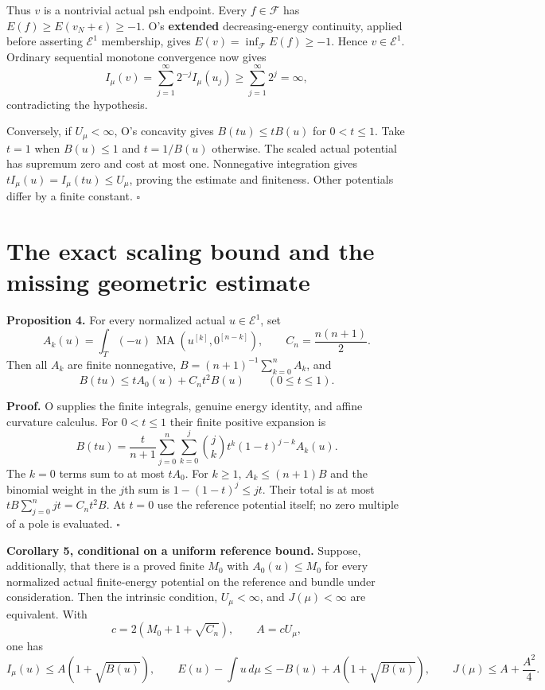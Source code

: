 \documentclass[
  11pt,
]{article}
\begin{document}
Thus \(v\) is a nontrivial actual psh endpoint. Every \(f\in\mathcal F\)
has \(E(f)\geq E(v_N+\epsilon)\geq-1\). O's \textbf{extended}
decreasing-energy continuity, applied before asserting \(\mathcal E^1\)
membership, gives \(E(v)=\inf_{\mathcal F}E(f)\geq-1\). Hence
\(v\in\mathcal E^1\). Ordinary sequential monotone convergence now gives
\[
 I_\mu(v)=\sum_{j=1}^\infty2^{-j}I_\mu(u_j)
          \geq\sum_{j=1}^\infty2^j=\infty,
\] contradicting the hypothesis.

Conversely, if \(U_\mu<\infty\), O's concavity gives \(B(tu)\leq tB(u)\)
for \(0<t\leq1\). Take \(t=1\) when \(B(u)\leq1\) and \(t=1/B(u)\)
otherwise. The scaled actual potential has supremum zero and cost at
most one. Nonnegative integration gives
\(tI_\mu(u)=I_\mu(tu)\leq U_\mu\), proving the estimate and finiteness.
Other potentials differ by a finite constant. \(\square\)

\section{The exact scaling bound and the missing geometric
estimate}\label{the-exact-scaling-bound-and-the-missing-geometric-estimate}

\textbf{Proposition 4.} For every normalized actual
\(u\in\mathcal E^1\), set \[
 A_k(u)=\int_T(-u)\,\operatorname{MA}(u^{[k]},0^{[n-k]}),\qquad
 C_n=\frac{n(n+1)}2.
\] Then all \(A_k\) are finite nonnegative,
\(B=(n+1)^{-1}\sum_{k=0}^nA_k\), and \[
 B(tu)\leq tA_0(u)+C_nt^2B(u)\qquad(0\leq t\leq1).
\]

\textbf{Proof.} O supplies the finite integrals, genuine energy
identity, and affine curvature calculus. For \(0<t\leq1\) their finite
positive expansion is \[
 B(tu)=\frac t{n+1}\sum_{j=0}^n\sum_{k=0}^j
       \binom jk t^k(1-t)^{j-k}A_k(u).
\] The \(k=0\) terms sum to at most \(tA_0\). For \(k\geq1\),
\(A_k\leq(n+1)B\) and the binomial weight in the \(j\)th sum is
\(1-(1-t)^j\leq jt\). Their total is at most
\(tB\sum_{j=0}^n jt=C_nt^2B\). At \(t=0\) use the reference potential
itself; no zero multiple of a pole is evaluated. \(\square\)

\textbf{Corollary 5, conditional on a uniform reference bound.} Suppose,
additionally, that there is a proved finite \(M_0\) with
\(A_0(u)\leq M_0\) for every normalized actual finite-energy potential
on the reference and bundle under consideration. Then the intrinsic
condition, \(U_\mu<\infty\), and \(J(\mu)<\infty\) are equivalent. With
\[
 c=2(M_0+1+\sqrt{C_n}),\qquad A=cU_\mu,
\] one has \[
 I_\mu(u)\leq A(1+\sqrt{B(u)}),\qquad
 E(u)-\int u\,d\mu\leq-B(u)+A(1+\sqrt{B(u)}),\qquad
 J(\mu)\leq A+\frac{A^2}4.
\]
\end{document}
